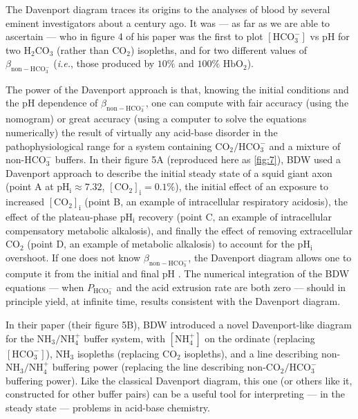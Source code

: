 \documentclass[fleqn,10pt]{physiome}
\begin{document}
The Davenport diagram traces its origins to the analyses of blood by several eminent investigators about a century ago. It was \cite{henderson1921blood} --- as far as we are able to ascertain --- who in figure 4 of his paper was the first to plot $\mathrm{[HCO_3^-]}$ vs $\mathrm{pH}$ for two $\mathrm{H_2CO_3}$ (rather than $\mathrm{CO_2}$) isopleths, and for two different values of $\beta_\mathrm{non-HCO_3^-}$ (\emph{i.e.}, those produced by $10\%$ and $100\%$ $\mathrm{HbO_2}$).

The power of the Davenport approach is that, knowing the initial conditions and the $\mathrm{pH}$ dependence of $\beta_\mathrm{non-HCO_3^-}$, one can compute with fair accuracy (using the nomogram) or great accuracy (using a computer to solve the equations numerically) the result of virtually any acid-base disorder in the pathophysiological range for a system containing $\mathrm{CO_2}/\mathrm{HCO_3^-}$ and a mixture of non-$\mathrm{HCO_3^-}$ buffers. In their figure 5A (reproduced here as \autoref{fig:7}), BDW used a Davenport approach to describe the initial steady state of a squid giant axon (point A at $\mathrm{pH_i} \approx7.32$, $\mathrm{[CO_2]_i} = 0.1\%$), the initial effect of an exposure to increased $\mathrm{[CO_2]_i}$ (point B, an example of intracellular respiratory acidosis), the effect of the plateau-phase $\mathrm{pH_i}$ recovery (point C, an example of intracellular compensatory metabolic alkalosis), and finally the effect of removing extracellular $\mathrm{CO_2}$ (point D, an example of metabolic alkalosis) to account for the $\mathrm{pH_i}$  overshoot. If one does not know $\beta_\mathrm{non-HCO_3^-}$, the Davenport diagram allows one to compute it from the initial and final $\mathrm{pH}$ . The numerical integration of the BDW equations --- when $P_\mathrm{HCO_3^-}$ and the acid extrusion rate are both zero --- should in principle yield, at infinite time, results consistent with the Davenport diagram.

In their paper (their figure 5B), BDW introduced a novel Davenport-like diagram for the $\mathrm{NH_3}/\mathrm{NH_4^+}$ buffer system, with $\mathrm{[NH_4^+]}$ on the ordinate (replacing $\mathrm{[HCO_3^-]}$), $\mathrm{NH_3}$ isopleths (replacing $\mathrm{CO_2}$ isopleths), and a line describing non-$\mathrm{NH_3}/\mathrm{NH_4^+}$ buffering power (replacing the line describing non-$\mathrm{CO_2}/\mathrm{HCO_3^-}$ buffering power). Like the classical Davenport diagram, this one (or others like it, constructed for other buffer pairs) can be a useful tool for interpreting --- in the steady state --- problems in acid-base chemistry.
\end{document}
